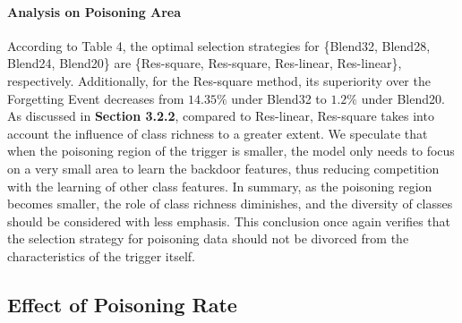 \documentclass{article}
\begin{document}
\paragraph{Analysis on Poisoning Area}
According to Table 4, the optimal selection strategies for \{Blend32, Blend28, Blend24, Blend20\} are \{Res-square, Res-square, Res-linear, Res-linear\}, respectively. Additionally, for the Res-square method, its superiority over the Forgetting Event decreases from \(14.35\%\) under Blend32 to \(1.2\%\) under Blend20. As discussed in \textbf{Section 3.2.2}, compared to Res-linear, Res-square takes into account the influence of class richness to a greater extent. We speculate that when the poisoning region of the trigger is smaller, the model only needs to focus on a very small area to learn the backdoor features, thus reducing competition with the learning of other class features. In summary, as the poisoning region becomes smaller, the role of class richness diminishes, and the diversity of classes should be considered with less emphasis. This conclusion once again verifies that the selection strategy for poisoning data should not be divorced from the characteristics of the trigger itself.
\subsection{Effect of Poisoning Rate}
\end{document}
